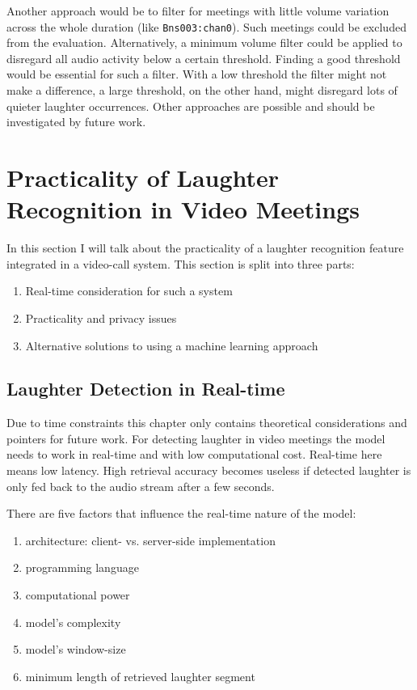 \documentclass[bsc,frontabs,parskip,deptreport]{infthesis}
\begin{document}
Another approach would be to filter for meetings with little volume variation across the whole duration (like \verb|Bns003:chan0|).
Such meetings could be excluded from the evaluation. 
Alternatively, a minimum volume filter could be applied to disregard all audio activity below a certain threshold.
Finding a good threshold would be essential for such a filter. With a low threshold the filter might not make a difference, a large threshold, on the other hand, might disregard lots of quieter laughter occurrences. 
Other approaches are possible and should be investigated by future work.



\chapter{Practicality of Laughter Recognition in Video Meetings} \label{cha:practicality}
In this section I will talk about the practicality of a laughter recognition feature integrated in a video-call system. 
This section is split into three parts: 
\begin{enumerate}
    \item Real-time consideration for such a system
    \item Practicality and privacy issues 
    \item Alternative solutions to using a machine learning approach 
\end{enumerate}

\section{Laughter Detection in Real-time} \label{sec:real-time}
Due to time constraints this chapter only contains theoretical considerations and pointers for future work. 
For detecting laughter in video meetings the model needs to work in real-time and with low computational cost. Real-time here means low latency.
High retrieval accuracy becomes useless if detected laughter is only fed back to the audio stream after a few seconds.


There are five factors that influence the real-time nature of the model:
\begin{enumerate}
    \item architecture: client- vs. server-side implementation
    \item programming language
    \item computational power 
    \item model's complexity
    \item model's window-size
    \item minimum length of retrieved laughter segment
\end{enumerate}
\end{document}
